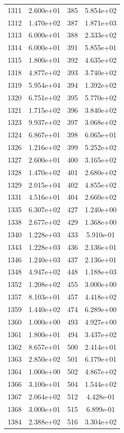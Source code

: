 \documentclass[12pt]{article}
\begin{document}
\begin{longtable}{@{}cccc@{}}
1311 & 2.600e+01 & 385 & 5.854e+02 \\
1312 & 1.470e+02 & 387 & 1.871e+03 \\
1313 & 6.000e+01 & 388 & 2.333e+02 \\
1314 & 6.000e+01 & 391 & 5.855e+01 \\
1315 & 1.800e+01 & 392 & 4.635e+02 \\
1318 & 4.877e+02 & 393 & 3.740e+02 \\
1319 & 5.954e+04 & 394 & 1.392e+02 \\
1320 & 6.751e+02 & 395 & 5.770e+02 \\
1321 & 1.715e+02 & 396 & 3.840e+02 \\
1323 & 9.937e+02 & 397 & 3.068e+02 \\
1324 & 6.867e+01 & 398 & 6.065e+01 \\
1326 & 1.216e+02 & 399 & 5.252e+02 \\
1327 & 2.600e+01 & 400 & 3.165e+02 \\
1328 & 1.470e+02 & 401 & 2.680e+02 \\
1329 & 2.015e+04 & 402 & 4.855e+02 \\
1331 & 4.516e+01 & 404 & 2.660e+02 \\
1335 & 6.307e+02 & 427 & 1.240e+00 \\
1338 & 2.677e+02 & 429 & 1.368e+00 \\
1340 & 1.228e+03 & 433 & 5.910e-01 \\
1343 & 1.228e+03 & 436 & 2.136e+01 \\
1346 & 1.240e+03 & 437 & 2.136e+01 \\
1348 & 4.947e+02 & 448 & 1.188e+03 \\
1352 & 1.208e+02 & 455 & 3.000e+00 \\
1357 & 8.103e+01 & 457 & 4.418e+02 \\
1359 & 1.440e+02 & 474 & 6.289e+00 \\
1360 & 1.000e+00 & 493 & 4.927e+00 \\
1361 & 1.800e+01 & 494 & 3.437e+02 \\
1362 & 8.657e+01 & 500 & 2.414e+01 \\
1363 & 2.850e+02 & 501 & 6.179e+01 \\
1364 & 1.000e+00 & 502 & 4.867e+02 \\
1366 & 3.100e+01 & 504 & 1.544e+02 \\
1367 & 2.064e+02 & 512 & 4.428e-01 \\
1368 & 3.000e+01 & 515 & 6.899e-01 \\
1384 & 2.388e+02 & 516 & 3.304e+02 \\

\end{longtable}
\end{document}

